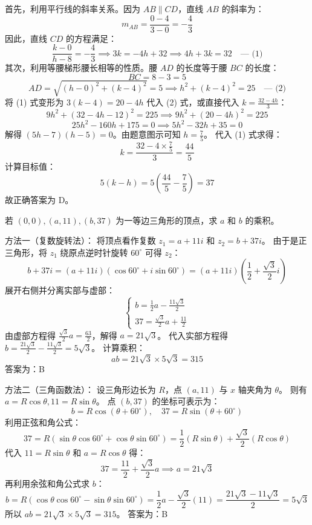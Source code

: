 \begin{questions}
\begin{solution}
首先，利用平行线的斜率关系。因为 $AB \parallel CD$，直线 $AB$ 的斜率为：
\[ m_{AB} = \frac{0-4}{3-0} = -\frac{4}{3} \]
因此，直线 $CD$ 的方程满足：
\[ \frac{k-0}{h-8} = -\frac{4}{3} \implies 3k = -4h + 32 \implies 4h + 3k = 32 \quad \text{--- (1)} \]
其次，利用等腰梯形腰长相等的性质。腰 $AD$ 的长度等于腰 $BC$ 的长度：
\[ BC = 8 - 3 = 5 \]
\[ AD = \sqrt{(h-0)^2 + (k-4)^2} = 5 \implies h^2 + (k-4)^2 = 25 \quad \text{--- (2)} \]
将 (1) 式变形为 $3(k-4) = 20-4h$ 代入 (2) 式，或直接代入 $k = \frac{32-4h}{3}$：
\[ 9h^2 + (32-4h-12)^2 = 225 \implies 9h^2 + (20-4h)^2 = 225 \]
\[ 25h^2 - 160h + 175 = 0 \implies 5h^2 - 32h + 35 = 0 \]
解得 $(5h-7)(h-5) = 0$。由题意图示可知 $h = \frac{7}{5}$。
代入 (1) 式求得：
\[ k = \frac{32 - 4 \times \frac{7}{5}}{3} = \frac{44}{5} \]
计算目标值：
\[ 5(k-h) = 5 \left( \frac{44}{5} - \frac{7}{5} \right) = 37 \]
故正确答案为 D。
\end{solution}
    \question 若 $(0, 0), (a, 11), (b, 37)$ 为一等边三角形的顶点，求 $a$ 和 $b$ 的乘积。
    \begin{solution}
方法一（复数旋转法）：
将顶点看作复数 $z_1 = a + 11i$ 和 $z_2 = b + 37i$。
由于是正三角形，将 $z_1$ 绕原点逆时针旋转 $60^\circ$ 可得 $z_2$：
\[
b + 37i = (a + 11i)(\cos 60^\circ + i \sin 60^\circ) = (a + 11i)(\frac{1}{2} + \frac{\sqrt{3}}{2}i)
\]
展开右侧并分离实部与虚部：
\[
\begin{cases}
b = \frac{1}{2}a - \frac{11\sqrt{3}}{2} \\
37 = \frac{\sqrt{3}}{2}a + \frac{11}{2}
\end{cases}
\]
由虚部方程得 $\frac{\sqrt{3}}{2}a = \frac{63}{2}$，解得 $a = 21\sqrt{3}$。
代入实部方程得 $b = \frac{21\sqrt{3}}{2} - \frac{11\sqrt{3}}{2} = 5\sqrt{3}$。
计算乘积：
\[
ab = 21\sqrt{3} \times 5\sqrt{3} = 315
\]
答案为：B
\end{solution}
\begin{solution}
方法二（三角函数法）：
设三角形边长为 $R$，点 $(a, 11)$ 与 $x$ 轴夹角为 $\theta$。
则有 $a = R \cos \theta, 11 = R \sin \theta$。
点 $(b, 37)$ 的坐标可表示为：
\[
b = R \cos(\theta + 60^\circ), \quad 37 = R \sin(\theta + 60^\circ)
\]
利用正弦和角公式：
\[
37 = R(\sin \theta \cos 60^\circ + \cos \theta \sin 60^\circ) = \frac{1}{2}(R \sin \theta) + \frac{\sqrt{3}}{2}(R \cos \theta)
\]
代入 $11 = R \sin \theta$ 和 $a = R \cos \theta$ 得：
\[
37 = \frac{11}{2} + \frac{\sqrt{3}}{2}a \implies a = 21\sqrt{3}
\]
再利用余弦和角公式求 $b$：
\[
b = R(\cos \theta \cos 60^\circ - \sin \theta \sin 60^\circ) = \frac{1}{2}a - \frac{\sqrt{3}}{2}(11) = \frac{21\sqrt{3} - 11\sqrt{3}}{2} = 5\sqrt{3}
\]
所以 $ab = 21\sqrt{3} \times 5\sqrt{3} = 315$。
答案为：B
\end{solution}


\end{questions}
